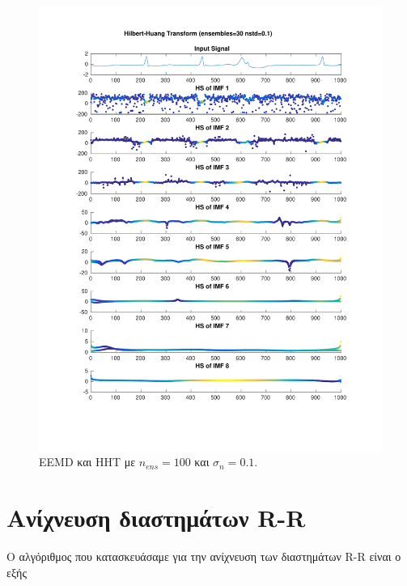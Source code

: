 \documentclass[11pt,a4paper]{article}
\begin{document}
\begin{figure}[H]
\begin{minipage}{0.48\textwidth}
	\includegraphics[width=\textwidth]{fig/221l1_hht_ensemble.pdf}
\end{minipage}
\vfill
\caption{EEMD και HHT με $n_{ens}=100$ και $\sigma_n = 0.1$.}
\label{fig:221l1_hht_ensemble}
\end{figure}

\section*{Ανίχνευση διαστημάτων R-R}

Ο αλγόριθμος που κατασκευάσαμε για την ανίχνευση των διαστημάτων R-R είναι ο εξής
\end{document}
